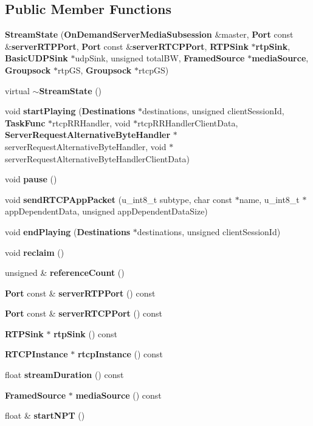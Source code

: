 \subsection*{Public Member Functions}
\begin{DoxyCompactItemize}
\item 
{\bf Stream\+State} ({\bf On\+Demand\+Server\+Media\+Subsession} \&master, {\bf Port} const \&{\bf server\+R\+T\+P\+Port}, {\bf Port} const \&{\bf server\+R\+T\+C\+P\+Port}, {\bf R\+T\+P\+Sink} $\ast${\bf rtp\+Sink}, {\bf Basic\+U\+D\+P\+Sink} $\ast$udp\+Sink, unsigned total\+B\+W, {\bf Framed\+Source} $\ast${\bf media\+Source}, {\bf Groupsock} $\ast$rtp\+G\+S, {\bf Groupsock} $\ast$rtcp\+G\+S)
\item 
virtual {\bf $\sim$\+Stream\+State} ()
\item 
void {\bf start\+Playing} ({\bf Destinations} $\ast$destinations, unsigned client\+Session\+Id, {\bf Task\+Func} $\ast$rtcp\+R\+R\+Handler, void $\ast$rtcp\+R\+R\+Handler\+Client\+Data, {\bf Server\+Request\+Alternative\+Byte\+Handler} $\ast$server\+Request\+Alternative\+Byte\+Handler, void $\ast$server\+Request\+Alternative\+Byte\+Handler\+Client\+Data)
\item 
void {\bf pause} ()
\item 
void {\bf send\+R\+T\+C\+P\+App\+Packet} (u\+\_\+int8\+\_\+t subtype, char const $\ast$name, u\+\_\+int8\+\_\+t $\ast$app\+Dependent\+Data, unsigned app\+Dependent\+Data\+Size)
\item 
void {\bf end\+Playing} ({\bf Destinations} $\ast$destinations, unsigned client\+Session\+Id)
\item 
void {\bf reclaim} ()
\item 
unsigned \& {\bf reference\+Count} ()
\item 
{\bf Port} const \& {\bf server\+R\+T\+P\+Port} () const 
\item 
{\bf Port} const \& {\bf server\+R\+T\+C\+P\+Port} () const 
\item 
{\bf R\+T\+P\+Sink} $\ast$ {\bf rtp\+Sink} () const 
\item 
{\bf R\+T\+C\+P\+Instance} $\ast$ {\bf rtcp\+Instance} () const 
\item 
float {\bf stream\+Duration} () const 
\item 
{\bf Framed\+Source} $\ast$ {\bf media\+Source} () const 
\item 
float \& {\bf start\+N\+P\+T} ()
\end{DoxyCompactItemize}
